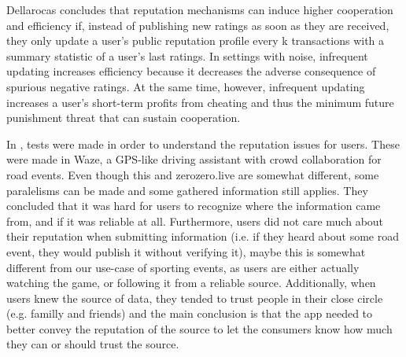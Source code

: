 Dellarocas \cite{Dellarocas2006-update-freq} concludes that reputation mechanisms can induce higher cooperation and efficiency if, instead of publishing new ratings as soon as they are received, they only update a user's public reputation profile every k transactions with a summary statistic of a user's last ratings. In settings with noise, infrequent updating increases efficiency because it decreases the adverse consequence of spurious negative ratings. At the same time, however, infrequent updating increases a user's short-term profits from cheating and thus the minimum future punishment threat that can sustain cooperation.

In \cite{Afonso2016}, tests were made in order to understand the reputation issues for users. These were made in Waze, a GPS-like driving assistant with crowd collaboration for road events. Even though this and zerozero.live are somewhat different, some paralelisms can be made and some gathered information still applies. They concluded that it was hard for users to recognize where the information came from, and if it was reliable at all. Furthermore, users did not care much about their reputation when submitting information (i.e. if they heard about some road event, they would publish it without verifying it), maybe this is somewhat different from our use-case of sporting events, as users are either actually watching the game, or following it from a reliable source. Additionally, when users knew the source of data, they tended to trust people in their close circle (e.g. familly and friends) and the main conclusion is that the app needed to better convey the reputation of the source to let the consumers know how much they can or should trust the source.

